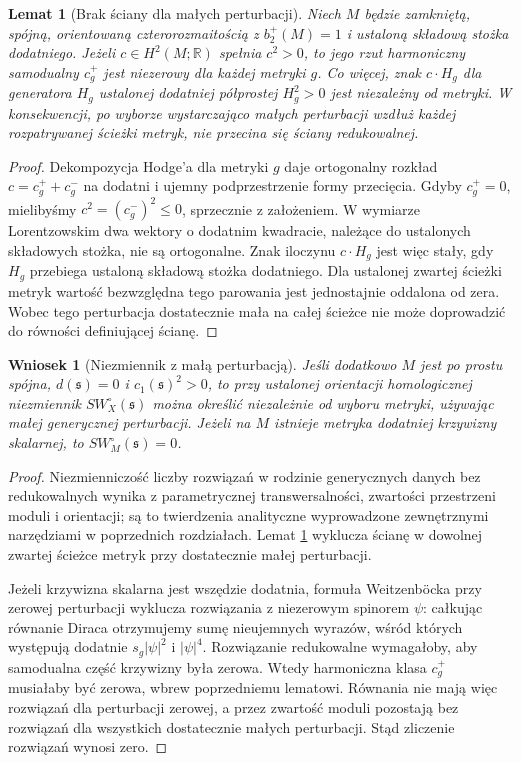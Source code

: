 \documentclass[11pt,a4paper]{report}
\numberwithin{equation}{section}
\theoremstyle{plain}
\newtheorem{lemat}[twierdzenie]{Lemat}
\newtheorem{wniosek}[twierdzenie]{Wniosek}
\theoremstyle{definition}
\theoremstyle{remark}
\begin{document}
\begin{lemat}[Brak ściany dla małych perturbacji]
\label{lem:tg-park14-no-wall}
Niech $M$ będzie zamkniętą, spójną, orientowaną
czterorozmaitością z $b_2^+(M)=1$ i ustaloną składową
stożka dodatniego. Jeżeli $c\in H^2(M;\mathbb R)$
spełnia $c^2>0$, to jego rzut harmoniczny samodualny
$c_g^+$ jest niezerowy dla każdej metryki $g$.
Co więcej, znak $c\cdot H_g$ dla generatora $H_g$
ustalonej dodatniej półprostej $H_g^2>0$ jest niezależny
od metryki. W konsekwencji, po wyborze wystarczająco małych
perturbacji wzdłuż każdej rozpatrywanej ścieżki metryk,
nie przecina się ściany redukowalnej.
\end{lemat}

\begin{proof}
Dekompozycja Hodge'a dla metryki $g$ daje ortogonalny
rozkład $c=c_g^++c_g^-$ na dodatni i ujemny podprzestrzenie
formy przecięcia. Gdyby $c_g^+=0$, mielibyśmy
$c^2=(c_g^-)^2\le0$, sprzecznie z założeniem.
W wymiarze Lorentzowskim dwa wektory o dodatnim kwadracie,
należące do ustalonych składowych stożka, nie są ortogonalne.
Znak iloczynu $c\cdot H_g$ jest więc stały, gdy $H_g$
przebiega ustaloną składową stożka dodatniego.
Dla ustalonej zwartej ścieżki metryk wartość bezwzględna
tego parowania jest jednostajnie oddalona od zera.
Wobec tego perturbacja dostatecznie mała na całej ścieżce
nie może doprowadzić do równości definiującej ścianę.
\end{proof}

\begin{wniosek}[Niezmiennik z małą perturbacją]
\label{cor:tg-park14-small-invariant}
Jeśli dodatkowo $M$ jest po prostu spójna, $d(\mathfrak s)=0$
i $c_1(\mathfrak s)^2>0$, to przy ustalonej orientacji
homologicznej niezmiennik $SW_X^{\circ}(\mathfrak s)$
można określić niezależnie od wyboru metryki, używając
małej generycznej perturbacji. Jeżeli na $M$ istnieje
metryka dodatniej krzywizny skalarnej, to
$SW_M^{\circ}(\mathfrak s)=0$.
\end{wniosek}

\begin{proof}
Niezmienniczość liczby rozwiązań w rodzinie generycznych
danych bez redukowalnych wynika z parametrycznej
transwersalności, zwartości przestrzeni moduli i orientacji;
są to twierdzenia analityczne wyprowadzone zewnętrznymi
narzędziami w poprzednich rozdziałach. Lemat
\ref{lem:tg-park14-no-wall} wyklucza ścianę w dowolnej
zwartej ścieżce metryk przy dostatecznie małej perturbacji.

Jeżeli krzywizna skalarna jest wszędzie dodatnia, formuła
Weitzenböcka przy zerowej perturbacji wyklucza rozwiązania
z niezerowym spinorem $\psi$: całkując równanie Diraca
otrzymujemy sumę nieujemnych wyrazów, wśród których
występują dodatnie $s_g|\psi|^2$ i $|\psi|^4$.
Rozwiązanie redukowalne wymagałoby, aby samodualna
część krzywizny była zerowa. Wtedy harmoniczna klasa
$c_g^+$ musiałaby być zerowa, wbrew poprzedniemu lematowi.
Równania nie mają więc rozwiązań dla perturbacji zerowej,
a przez zwartość moduli pozostają bez rozwiązań dla
wszystkich dostatecznie małych perturbacji.
Stąd zliczenie rozwiązań wynosi zero.
\end{proof}
\end{document}
